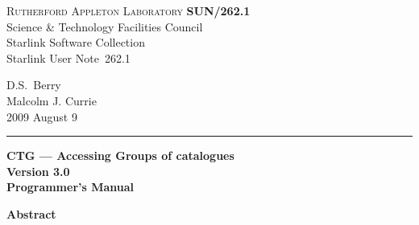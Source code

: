 \documentclass[twoside,11pt]{article}
\newcommand{\stardoccategory}  {Starlink User Note}
\newcommand{\stardocinitials}  {SUN}
\newcommand{\stardocnumber}    {262.1}
\newcommand{\stardocauthors}   {D.S.\ Berry \\ Malcolm J. Currie}
\newcommand{\stardocdate}      {2009 August 9}
\newcommand{\stardoctitle}     {CTG --- Accessing Groups of catalogues}
\newcommand{\stardocversion}   {Version 3.0}
\newcommand{\stardocmanual}    {Programmer's Manual}
\newcommand{\stardocname}{\stardocinitials /\stardocnumber}
\newenvironment{latexonly}{}{}
\renewcommand{\_}{\texttt{\symbol{95}}}
\begin{document}
\thispagestyle{empty}

\begin{latexonly}
   \textsc{Rutherford Appleton Laboratory} \hfill \textbf{\stardocname}\\
   {\large Science \& Technology Facilities Council}\\
   {\large Starlink Software Collection\\}
   {\large \stardoccategory\ \stardocnumber}
   \begin{flushright}
   \stardocauthors\\
   \stardocdate
   \end{flushright}
   \vspace{-4mm}
   \rule{\textwidth}{0.5mm}
   \vspace{5mm}
   \begin{center}
   {\Huge\textbf{\stardoctitle \\ [2.5ex]}}
   {\LARGE\textbf{\stardocversion \\ [4ex]}}
   {\Huge\textbf{\stardocmanual}}
   \end{center}
   \vspace{5mm}


   \vspace{10mm}
   \begin{center}
      {\Large\textbf{Abstract}}
   \end{center}
\end{latexonly}
\end{document}
